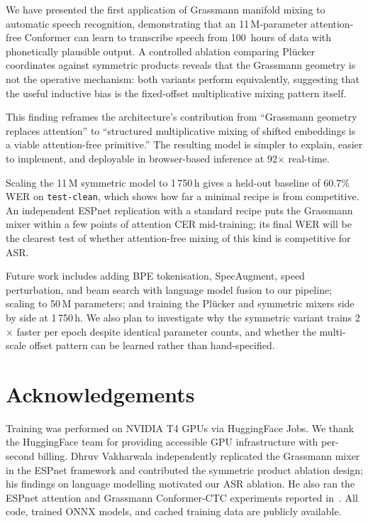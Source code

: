\documentclass[11pt,a4paper]{article}
\newcommand{\plucker}{Pl\"{u}cker}
\begin{document}
We have presented the first application of Grassmann manifold mixing to
automatic speech recognition, demonstrating that an 11\,M-parameter
attention-free Conformer can learn to transcribe speech from 100~hours
of data with phonetically plausible output.  A controlled ablation
comparing \plucker{} coordinates against symmetric products reveals that
the Grassmann geometry is not the operative mechanism: both variants
perform equivalently, suggesting that the useful inductive bias is the
fixed-offset multiplicative mixing pattern itself.

This finding reframes the architecture's contribution from ``Grassmann
geometry replaces attention'' to ``structured multiplicative mixing of
shifted embeddings is a viable attention-free primitive.''  The
resulting model is simpler to explain, easier to implement, and
deployable in browser-based inference at 92$\times$ real-time.

Scaling the 11\,M symmetric model to 1\,750\,h gives a held-out
baseline of 60.7\% WER on \texttt{test-clean}, which shows how far a
minimal recipe is from competitive.  An independent ESPnet replication
with a standard recipe puts the Grassmann mixer within a few points of
attention CER mid-training; its final WER will be the clearest test of
whether attention-free mixing of this kind is competitive for ASR.

Future work includes adding BPE tokenisation, SpecAugment, speed
perturbation, and beam search with language model fusion to our
pipeline; scaling to 50\,M parameters; and training the \plucker{}
and symmetric mixers side by side at 1\,750\,h.  We also plan to investigate why the symmetric
variant trains 2$\times$ faster per epoch despite identical parameter
counts, and whether the multi-scale offset pattern can be learned rather
than hand-specified.

\section*{Acknowledgements}
Training was performed on NVIDIA T4 GPUs via HuggingFace Jobs.  We thank
the HuggingFace team for providing accessible GPU infrastructure with
per-second billing.  Dhruv Vakharwala independently replicated the
Grassmann mixer in the ESPnet framework and contributed the symmetric
product ablation design; his findings on language modelling motivated
our ASR ablation.  He also ran the ESPnet attention and Grassmann
Conformer-CTC experiments reported in~.  All code,
trained ONNX models, and cached training data are publicly available.
\end{document}
